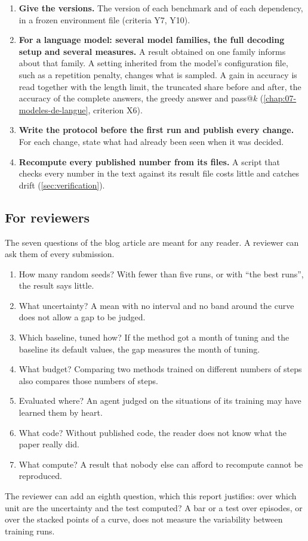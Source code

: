 \begin{enumerate}
  \item \textbf{Give the versions.} The version of each benchmark and of each dependency, in a frozen
        environment file (criteria Y7, Y10).
  \item \textbf{For a language model: several model families, the full decoding setup and several
        measures.} A result obtained on one family informs about that family. A setting inherited
        from the model's configuration file, such as a repetition penalty, changes what is sampled. A
        gain in accuracy is read together with the length limit, the truncated share before and
        after, the accuracy of the complete answers, the greedy answer and pass@$k$
        (\cref{chap:07-modeles-de-langue}, criterion X6).
  \item \textbf{Write the protocol before the first run and publish every change.} For each change,
        state what had already been seen when it was decided.
  \item \textbf{Recompute every published number from its files.} A script that checks every number
        in the text against its result file costs little and catches drift
        (\cref{sec:verification}).
\end{enumerate}

\subsection{For reviewers}

The seven questions of the blog article are meant for any reader. A reviewer can ask them of every
submission.
\begin{enumerate}
  \item How many random seeds? With fewer than five runs, or with \enquote{the best runs}, the result
        says little.
  \item What uncertainty? A mean with no interval and no band around the curve does not allow a gap
        to be judged.
  \item Which baseline, tuned how? If the method got a month of tuning and the baseline its default
        values, the gap measures the month of tuning.
  \item What budget? Comparing two methods trained on different numbers of steps also compares those
        numbers of steps.
  \item Evaluated where? An agent judged on the situations of its training may have learned them by
        heart.
  \item What code? Without published code, the reader does not know what the paper really did.
  \item What compute? A result that nobody else can afford to recompute cannot be reproduced.
\end{enumerate}
The reviewer can add an eighth question, which this report justifies: over which unit are the
uncertainty and the test computed? A bar or a test over episodes, or over the stacked points of a
curve, does not measure the variability between training runs.

